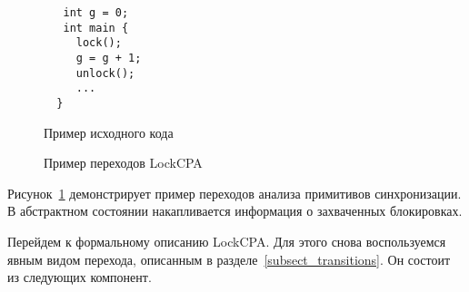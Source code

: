 \begin{figure}[h]
\begin{minipage}[h]{0.3\textwidth}
\begin{verbatim}
   int g = 0;
   int main {
     lock();
     g = g + 1;
     unlock();
     ...
  }
\end{verbatim}
\caption{Пример исходного кода}
\label{LockCodeExample}
\end{minipage}
\hfill
\begin{minipage}{0.6\textwidth}
    \caption{Пример переходов LockCPA}
    \label{img:LockCPA}
\end{minipage}
\end{figure}

Рисунок~\ref{img:LockCPA} демонстрирует пример переходов анализа примитивов синхронизации.
В абстрактном состоянии накапливается информация о захваченных блокировках. 

Перейдем к формальному описанию LockCPA.
Для этого снова воспользуемся явным видом перехода, описанным в разделе~\ref{subsect_transitions}.
Он состоит из следующих компонент.

